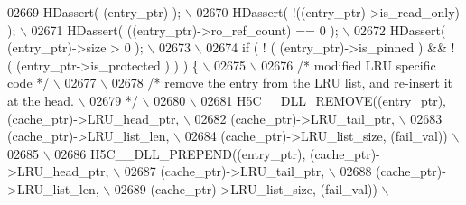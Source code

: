 \begin{DoxyCode}
02669 \textcolor{preprocessor}{    HDassert( (entry\_ptr) );                                                 \(\backslash\)}
02670 \textcolor{preprocessor}{    HDassert( !((entry\_ptr)->is\_read\_only) );                                \(\backslash\)}
02671 \textcolor{preprocessor}{    HDassert( ((entry\_ptr)->ro\_ref\_count) == 0 );                            \(\backslash\)}
02672 \textcolor{preprocessor}{    HDassert( (entry\_ptr)->size > 0 );                                       \(\backslash\)}
02673 \textcolor{preprocessor}{                                                                             \(\backslash\)}
02674 \textcolor{preprocessor}{    if ( ! ( (entry\_ptr)->is\_pinned ) && ! ( (entry\_ptr->is\_protected ) ) ) \{ \(\backslash\)}
02675 \textcolor{preprocessor}{                                                                         \(\backslash\)}
02676 \textcolor{preprocessor}{        }\textcolor{comment}{/* modified LRU specific code */}\textcolor{preprocessor}{                                     \(\backslash\)}
02677 \textcolor{preprocessor}{                                                                             \(\backslash\)}
02678 \textcolor{preprocessor}{        }\textcolor{comment}{/* remove the entry from the LRU list, and re-insert it at the head. \(\backslash\)}
02679 \textcolor{comment}{     */}\textcolor{preprocessor}{                                                                  \(\backslash\)}
02680 \textcolor{preprocessor}{                                                                             \(\backslash\)}
02681 \textcolor{preprocessor}{            H5C\_\_DLL\_REMOVE((entry\_ptr), (cache\_ptr)->LRU\_head\_ptr,          \(\backslash\)}
02682 \textcolor{preprocessor}{                             (cache\_ptr)->LRU\_tail\_ptr,                      \(\backslash\)}
02683 \textcolor{preprocessor}{                 (cache\_ptr)->LRU\_list\_len,                      \(\backslash\)}
02684 \textcolor{preprocessor}{                             (cache\_ptr)->LRU\_list\_size, (fail\_val))         \(\backslash\)}
02685 \textcolor{preprocessor}{                                                                             \(\backslash\)}
02686 \textcolor{preprocessor}{        H5C\_\_DLL\_PREPEND((entry\_ptr), (cache\_ptr)->LRU\_head\_ptr,             \(\backslash\)}
02687 \textcolor{preprocessor}{                         (cache\_ptr)->LRU\_tail\_ptr,                          \(\backslash\)}
02688 \textcolor{preprocessor}{             (cache\_ptr)->LRU\_list\_len,                          \(\backslash\)}
02689 \textcolor{preprocessor}{                         (cache\_ptr)->LRU\_list\_size, (fail\_val))             \(\backslash\)}

\end{DoxyCode}
